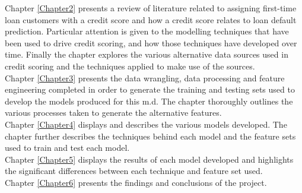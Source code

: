 Chapter \ref{Chapter2} presents a review of literature related to assigning first-time loan customers with a credit score and how a credit score relates to loan default prediction. Particular attention is given to the modelling techniques that have been used to drive credit scoring, and how those techniques have developed over time. Finally the chapter explores the various alternative data sources used in credit scoring and the techniques applied to make use of the sources. \\

Chapter \ref{Chapter3} presents the data wrangling, data processing and feature engineering completed in order to generate the training and testing sets used to develop the models produced for this m.d. The chapter thoroughly outlines the various processes taken to generate the alternative features. \\

Chapter \ref{Chapter4} displays and describes the various models developed. The chapter further describes the techniques behind each model and the feature sets used to train and test each model. \\

Chapter \ref{Chapter5} displays the results of each model developed and highlights the significant differences between each technique and  feature set used. \\

Chapter \ref{Chapter6} presents the findings and conclusions of the project. 


